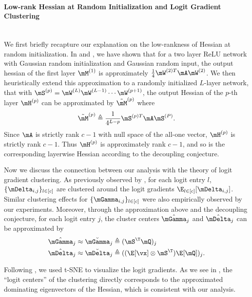 \paragraph{Low-rank Hessian at Random Initialization and Logit Gradient Clustering}\text{} \\
We first briefly recapture our explanation on the low-rankness of Hessian at random initialization. In  and , we have shown that for a two layer ReLU network with Gaussian random initialization and Gaussian random input, the output hessian of the first layer $\mM^{(1)}$ is approximately $\frac{1}{4}\mW^{(2)T}\mA\mW^{(2)}$. We then heuristically extend this approximation to a randomly initialized $L$-layer network, that with $\mS^{(p)} = \mW^{(L)}\mW^{(L-1)}\cdots\mW^{(p+1)}$, the output Hessian of the $p$-th layer $\mH^{(p)}$ can be approximated by $\Tilde{\mM}^{(p)}$ where
\begin{equation}
    \label{eqn:M_SAS_Approx}
    \Tilde{\mM}^{(p)} \triangleq \frac{1}{4^{L-p}}\mS^{(p)T}\mA\mS^{(P)}.
\end{equation}
Since $\mA$ is strictly rank $c-1$ with null space of the all-one vector, $\mH^{(p)}$ is strictly rank $c-1$. Thus $\mH^{(p)}$ is approximately rank $c-1$, and so is the corresponding layerwise Hessian according to the decoupling conjecture.

Now we discuss the connection between our analysis with the theory of logit gradient clustering. As previously observed by \citet{papyan2019measurements}, for each logit entry $l$, $\{\mDelta_{i,j}\}_{l\in[c]}$ are clustered around the logit gradients $\E_{l\in[c]}[\mDelta_{i,j}]$. Similar clustering effects for $\{\mGamma_{i,j}\}_{l\in[c]}$ were also empirically observed by our experiments. Moreover, through the approximation above and the decoupling conjecture, for each logit entry $j$, the cluster centers $\hat{\mGamma}_j$ and $\hat{\mDelta}_j$ can be approximated by
\begin{equation}
\begin{split}
    \hat{\mGamma}_j \approx \Breve{\mGamma}_j &\triangleq (\mS^\T\mQ)_j\\ \hat{\mDelta}_j \approx \Breve{\mDelta}_j &\triangleq ((\E[\vx]\otimes\mS^\T)\E[\mQ])_j.
\end{split}
\end{equation}

Following \citet{papyan2019measurements}, we used t-SNE \citep{vanDerMaaten2008} to visualize the logit gradients. As we see in , the ``logit centers'' of the clustering directly corresponds to the approximated dominating eigenvectors of the Hessian, which is consistent with our analysis.

